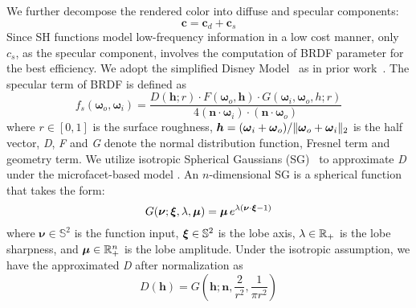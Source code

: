 We further decompose the rendered color into diffuse and specular components: 
\begin{equation}
    \boldsymbol{c} = \boldsymbol{c}_d + \boldsymbol{c}_s 
\end{equation}
Since SH functions model low-frequency information in a low cost manner, only $c_s$, as the specular component, involves the computation of BRDF parameter for the best efficiency. We adopt the simplified Disney Model~\cite{burley2012physically,karis2013real} as in prior work~\cite{zhang2021physg,gao2023relightable}. The specular term of BRDF is defined as 
\begin{equation}
    f_{s}(\boldsymbol{\omega}_{o}, \boldsymbol{\omega}_{i})=\frac{D(\boldsymbol{h}; r) \cdot F(\boldsymbol{\omega}_{o},\boldsymbol{h}) \cdot G(\boldsymbol{\omega}_{i},\boldsymbol{\omega}_{o}, h; r)}{4(\boldsymbol{n} \cdot \boldsymbol{\omega}_{i}) \cdot (\boldsymbol{n} \cdot \boldsymbol{\omega}_{o})}
    \label{eq:specular_term}
\end{equation}
where $r\in[0, 1]$ is the surface roughness, $\boldsymbol{h}=({\boldsymbol{\omega}_{i}+\boldsymbol{\omega}_{o}}) / \|{\boldsymbol{\omega}_o} + {\boldsymbol{\omega}_i}\|_2$ is the half vector, \textit{D}, \textit{F} and \textit{G} denote the normal distribution function, Fresnel term and geometry term. We utilize isotropic Spherical Gaussians (SG)~\cite{wang2009all} to approximate \textit{D} under the microfacet-based model \cite{cook1981reflectance}. An $n$-dimensional SG is a spherical function that takes the form:
\begin{equation}\label{eq:sg} 
    G(\boldsymbol{\nu}; \boldsymbol{\xi}, \lambda, \boldsymbol{\mu}) = \boldsymbol{\mu} \, e^{\lambda (\boldsymbol{\nu} \cdot \boldsymbol{\xi} - 1)}
\end{equation}
where $\boldsymbol{\nu} \in \mathbb{S}^2$ is the function input, $\boldsymbol{\xi} \in \mathbb{S}^2$ is the lobe axis, $\lambda \in \mathbb{R}_+$ is the lobe sharpness, and $\boldsymbol{\mu} \in \mathbb{R}_+^n$ is the lobe amplitude. Under the isotropic assumption, we have the approximated \textit{D} after normalization as
\begin{equation}
    D(\boldsymbol{h}) = G(\boldsymbol{h}; \boldsymbol{n}, \frac{2}{r^2}, \frac{1}{\pi r^2})
\end{equation}


